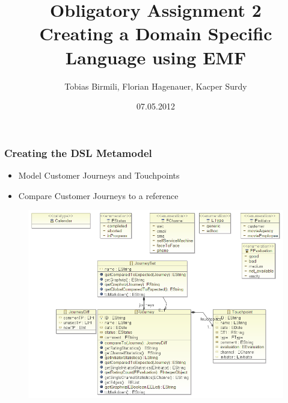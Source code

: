 \documentclass[13pt]{beamer}
\title{Obligatory Assignment 2 \\ Creating a Domain Specific Language using EMF}
\author{Tobias Birmili, Florian Hagenauer, Kacper Surdy}
\institute{University of Oslo}
\date{07.05.2012}
\begin{document}
\begin{frame}
	\titlepage
\end{frame}

\begin{frame}
	\frametitle{Creating the DSL Metamodel}
	\begin{itemize}
		\item Model Customer Journeys and Touchpoints
		\item Compare Customer Journeys to a reference
	\end{itemize}
	\begin{figure}[hbtp]
		\centering
		\includegraphics[scale=0.35]{img/JourneyModel.png}
	\end{figure}
\end{frame}
\end{document}
